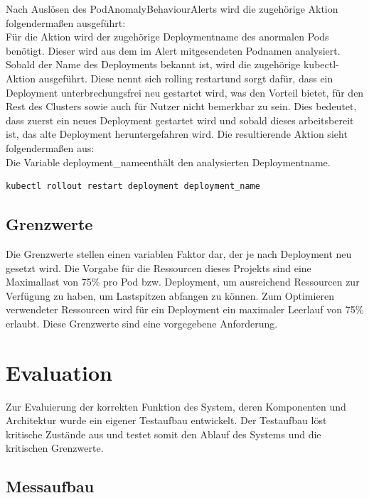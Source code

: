 \documentclass[a4paper,10pt]{scrartcl}
\begin{document}
Nach Auslösen des \glqq PodAnomalyBehaviour\grqq Alerts wird die zugehörige Aktion folgendermaßen ausgeführt:\\

Für die Aktion wird der zugehörige Deploymentname des anormalen Pods benötigt. Dieser wird aus dem im Alert mitgesendeten Podnamen analysiert. Sobald der Name des Deployments bekannt ist, wird die zugehörige kubectl-Aktion ausgeführt. Diese nennt sich \glqq rolling restart\grqq und sorgt dafür, dass ein Deployment unterbrechungsfrei neu gestartet wird, was den Vorteil bietet, für den Rest des Clusters sowie auch für Nutzer nicht bemerkbar zu sein. Dies bedeutet, dass zuerst ein neues Deployment gestartet wird und sobald dieses arbeitsbereit ist, das alte Deployment heruntergefahren wird. Die resultierende Aktion sieht folgendermaßen aus:\\
Die Variable \glqq deployment\_name\grqq enthält den analysierten Deploymentname.
\begin{lstlisting}
kubectl rollout restart deployment deployment_name
\end{lstlisting}

\subsection{Grenzwerte}

Die Grenzwerte stellen einen variablen Faktor dar, der je nach Deployment neu gesetzt wird. Die Vorgabe für die Ressourcen dieses Projekts sind eine Maximallast von 75\% pro Pod bzw. Deployment, um ausreichend Ressourcen zur Verfügung zu haben, um Lastspitzen abfangen zu können. Zum Optimieren verwendeter Ressourcen wird für ein Deployment ein maximaler Leerlauf von 75\% erlaubt. Diese Grenzwerte sind eine vorgegebene Anforderung.

\pagebreak
\section{Evaluation}

Zur Evaluierung der korrekten Funktion des System, deren Komponenten und Architektur wurde ein eigener Testaufbau entwickelt. Der Testaufbau löst kritische Zustände aus und testet somit den Ablauf des Systems und die kritischen Grenzwerte.

\subsection{Messaufbau}
\end{document}
